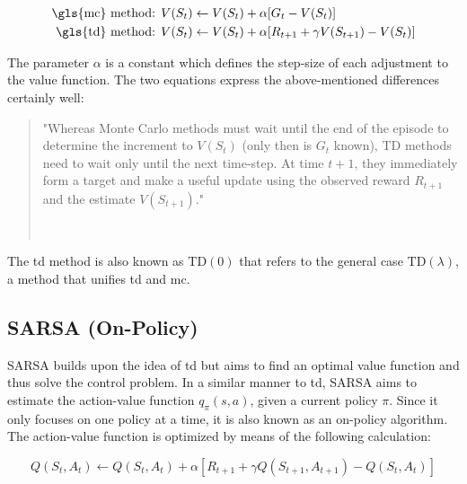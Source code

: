 \documentclass[draft,final]{vutinfth} %
\newcommand{\p}[1]{see p. #1}
\begin{document}
    \begin{equation}
        \begin{aligned}[t]
            \text{\gls{mc} method: } & V(S_t) \leftarrow V(S_t) + \alpha [G_t - V(S_t)]\\
            \text{\gls{td} method: } & V(S_t) \leftarrow V(S_t) + \alpha [R_{t+1} + \gamma V(S_{t+1})-V(S_t)]\\
        \end{aligned}\label{eq:td_versus_mc}
    \end{equation}

    The parameter $\alpha$ is a constant which defines the step-size of each adjustment to the value function.
    The two equations express the above-mentioned differences certainly well:

    \begin{quote}
        "Whereas Monte Carlo methods must wait until the end of the episode to determine the increment to $V(S_t)$ (only then is $G_t$ known), TD methods need to wait only until the next time-step.
        At time $t + 1$, they immediately form a target and make a useful update using the observed reward $R_{t+1}$ and the estimate $V(S_{t+1})$."

        \hfill~\cite[\p{120}]{sutton_reinforcement_2018}
    \end{quote}

    The \gls{td} method is also known as $\text{TD}(0)$ that refers to the general case $\text{TD}(\lambda)$, a method that unifies \gls{td} and \gls{mc}.

    \subsection{SARSA (On-Policy)}\label{subsec:sarsanullon-policynull}

    SARSA builds upon the idea of \gls{td} but aims to find an optimal value function and thus solve the control problem.
    In a similar manner to \gls{td}, SARSA aims to estimate the action-value function $q_\pi(s,a)$, given a current policy $\pi$.
    Since it only focuses on one policy at a time, it is also known as an on-policy algorithm.
    The action-value function is optimized by means of the following calculation:

    \begin{equation}
        Q(S_t,A_t) \leftarrow Q(S_t,A_t) + \alpha [R_{t+1} + \gamma Q(S_{t+1},A_{t+1}) - Q(S_{t},A_{t}) ]
    \end{equation}
\end{document}
